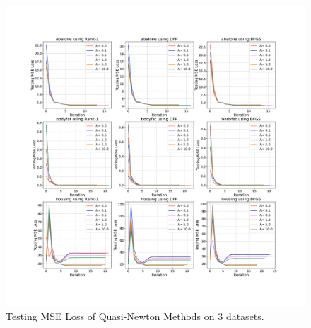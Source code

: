 \begin{figure}[!htbp]
    \centering
    \includegraphics[scale = 0.28]{fig/QN.pdf}
    \caption{Testing MSE Loss of Quasi-Newton Methods on \(3\) datasets.}
    \label{fig:qn}
\end{figure}